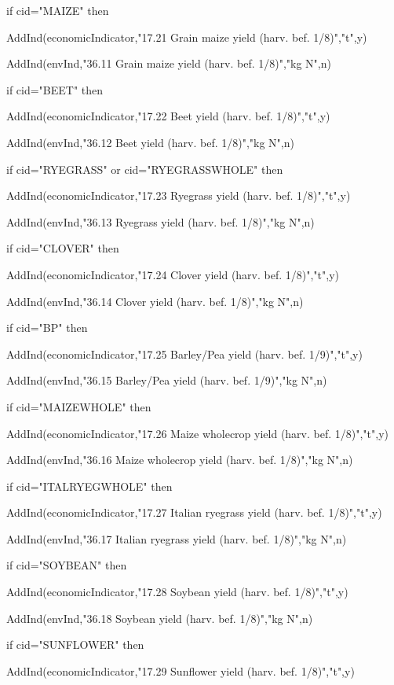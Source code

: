 \documentclass[%
]{scrartcl}
\begin{document}
{{{   if cid="MAIZE" then 
	
   \quad 	AddInd(economicIndicator,"17.21 Grain maize yield (harv. bef. 1/8)","t",y)
   	
 \quad AddInd(envInd,"36.11 Grain maize yield (harv. bef. 1/8)","kg N",n)
   
   if cid="BEET" then 
	
   \quad 	AddInd(economicIndicator,"17.22 Beet yield (harv. bef. 1/8)","t",y)
   	
 \quad AddInd(envInd,"36.12 Beet yield (harv. bef. 1/8)","kg N",n)
  
   if cid="RYEGRASS" or cid="RYEGRASSWHOLE" then 
	
   \quad 	AddInd(economicIndicator,"17.23 Ryegrass yield (harv. bef. 1/8)","t",y)
   	
 \quad AddInd(envInd,"36.13 Ryegrass yield (harv. bef. 1/8)","kg N",n)
 
   if cid="CLOVER" then 
	
   \quad 	AddInd(economicIndicator,"17.24 Clover yield (harv. bef. 1/8)","t",y)
   	
\quad  AddInd(envInd,"36.14 Clover yield (harv. bef. 1/8)","kg N",n)
   
   if cid="BP" then 
	
  \quad  	AddInd(economicIndicator,"17.25 Barley/Pea yield (harv. bef. 1/9)","t",y)
   	
\quad  AddInd(envInd,"36.15 Barley/Pea yield (harv. bef. 1/9)","kg N",n)
   
   if cid="MAIZEWHOLE" then 
	
   \quad 	AddInd(economicIndicator,"17.26 Maize wholecrop yield (harv. bef. 1/8)","t",y)
   	
 \quad AddInd(envInd,"36.16 Maize wholecrop yield (harv. bef. 1/8)","kg N",n)
   
   if cid="ITALRYEGWHOLE" then 
	
 \quad   	AddInd(economicIndicator,"17.27 Italian ryegrass yield (harv. bef. 1/8)","t",y)
   	 
\quad AddInd(envInd,"36.17 Italian ryegrass yield (harv. bef. 1/8)","kg N",n)
  
   if cid="SOYBEAN" then 
	
 \quad   	AddInd(economicIndicator,"17.28 Soybean yield (harv. bef. 1/8)","t",y)
   
\quad 	 AddInd(envInd,"36.18 Soybean yield (harv. bef. 1/8)","kg N",n)
   
   if cid="SUNFLOWER" then 
	
  \quad  	AddInd(economicIndicator,"17.29 Sunflower yield (harv. bef. 1/8)","t",y)
   	
}}}
\end{document}
